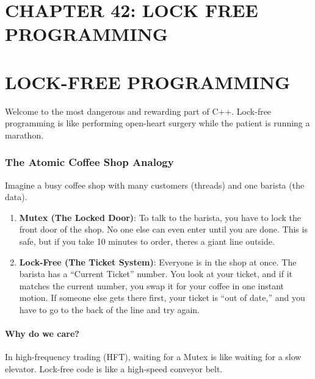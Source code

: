 \hypertarget{chapter-42-lock-free-programming}{%
\section{CHAPTER 42: LOCK FREE
PROGRAMMING}\label{chapter-42-lock-free-programming}}

\hypertarget{lock-free-programming}{%
\section{LOCK-FREE PROGRAMMING}\label{lock-free-programming}}

Welcome to the most dangerous and rewarding part of C++. Lock-free
programming is like performing open-heart surgery while the patient is
running a marathon.

\hypertarget{the-atomic-coffee-shop-analogy}{%
\subsubsection{The Atomic Coffee Shop
Analogy}\label{the-atomic-coffee-shop-analogy}}

Imagine a busy coffee shop with many customers (threads) and one barista
(the data).

\begin{enumerate}
\def\labelenumi{\arabic{enumi}.}
\tightlist
\item
  \textbf{Mutex (The Locked Door)}: To talk to the barista, you have to
  lock the front door of the shop. No one else can even enter until you
  are done. This is safe, but if you take 10 minutes to order, theres a
  giant line outside.
\item
  \textbf{Lock-Free (The Ticket System)}: Everyone is in the shop at
  once. The barista has a ``Current Ticket'' number. You look at your
  ticket, and if it matches the current number, you swap it for your
  coffee in one instant motion. If someone else gets there first, your
  ticket is ``out of date,'' and you have to go to the back of the line
  and try again.
\end{enumerate}

\hypertarget{why-do-we-care}{%
\paragraph{Why do we care?}\label{why-do-we-care}}

In high-frequency trading (HFT), waiting for a Mutex is like waiting for
a slow elevator. Lock-free code is like a high-speed conveyor belt.

